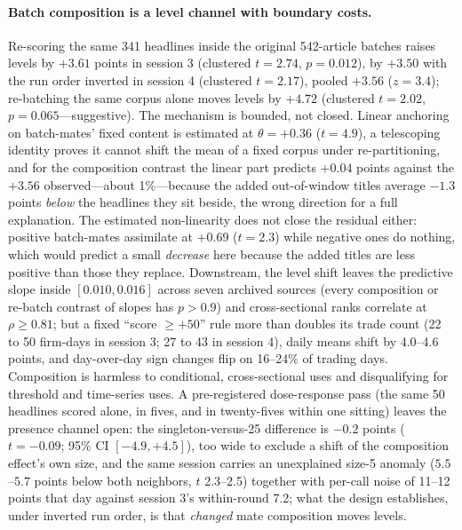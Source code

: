 \documentclass[11pt]{article}
\begin{document}
\paragraph{Batch composition is a level channel with boundary costs.}
Re-scoring the same 341 headlines inside the original 542-article batches raises levels by $+3.61$ points in session 3 (clustered $t=2.74$, $p=0.012$), by $+3.50$ with the run order inverted in session 4 (clustered $t=2.17$), pooled $+3.56$ ($z=3.4$); re-batching the same corpus alone moves levels by $+4.72$ (clustered $t=2.02$, $p=0.065$---suggestive). The mechanism is bounded, not closed. Linear anchoring on batch-mates' fixed content is estimated at $\theta=+0.36$ ($t=4.9$), a telescoping identity proves it cannot shift the mean of a fixed corpus under re-partitioning, and for the composition contrast the linear part predicts $+0.04$ points against the $+3.56$ observed---about 1\%---because the added out-of-window titles average $-1.3$ points \emph{below} the headlines they sit beside, the wrong direction for a full explanation. The estimated non-linearity does not close the residual either: positive batch-mates assimilate at $+0.69$ ($t=2.3$) while negative ones do nothing, which would predict a small \emph{decrease} here because the added titles are less positive than those they replace. Downstream, the level shift leaves the predictive slope inside $[0.010,0.016]$ across seven archived sources (every composition or re-batch contrast of slopes has $p>0.9$) and cross-sectional ranks correlate at $\rho\geq0.81$; but a fixed ``score $\geq+50$'' rule more than doubles its trade count (22 to 50 firm-days in session 3; 27 to 43 in session 4), daily means shift by 4.0--4.6 points, and day-over-day sign changes flip on 16--24\% of trading days. Composition is harmless to conditional, cross-sectional uses and disqualifying for threshold and time-series uses. A pre-registered dose-response pass (the same 50 headlines scored alone, in fives, and in twenty-fives within one sitting) leaves the presence channel open: the singleton-versus-25 difference is $-0.2$ points ($t=-0.09$; 95\% CI $[-4.9, +4.5]$), too wide to exclude a shift of the composition effect's own size, and the same session carries an unexplained size-5 anomaly ($5.5$--$5.7$ points below both neighbors, $t$ 2.3--2.5) together with per-call noise of 11--12 points that day against session 3's within-round 7.2; what the design establishes, under inverted run order, is that \emph{changed} mate composition moves levels.
\end{document}
